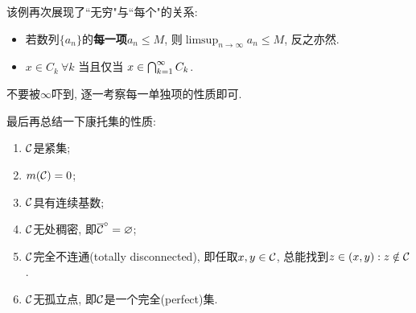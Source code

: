 \begin{remark}
    该例再次展现了``无穷"与``每个"的关系:
    \begin{itemize}
    \item 若数列$\{a_n\}$的\textbf{每一项}$a_n \leq M$, 则$\limsup_{n \to \infty}a_n \leq M$, 反之亦然. 
    \item $x \in C_k~\forall k$ 当且仅当 $x \in \bigcap_{k=1}^{\infty}C_k$.
    \end{itemize}
    不要被$\infty$吓到, 逐一考察每一单独项的性质即可. 
\end{remark}
最后再总结一下康托集的性质:
\begin{property}
    \begin{enumerate}
    \item $\mathcal{C}$是紧集;
    \item $m(\mathcal{C})=0$;
    \item $\mathcal{C}$具有连续基数;
    \item $\mathcal{C}$无处稠密, 即$\overline{\mathcal{C}}^\circ=\varnothing$;
    \item $\mathcal{C}$完全不连通(totally disconnected), 即任取$x,y \in \mathcal{C}$, 总能找到$z \in (x,y): z \notin \mathcal{C}$. 
    \item $\mathcal{C}$无孤立点, 即$\mathcal{C}$是一个完全(perfect)集.
    \end{enumerate}
\end{property}
